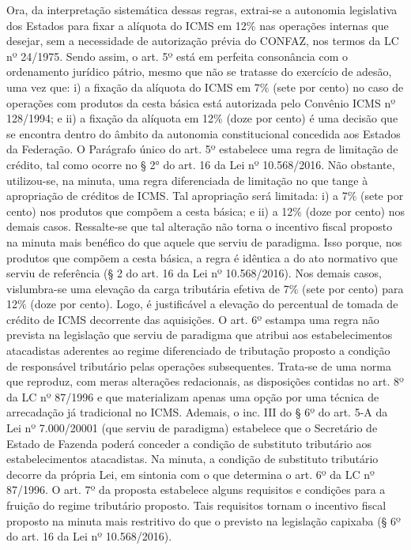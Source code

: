 \documentclass[10pt]{article}
\begin{document}
Ora, da interpretação sistemática dessas regras, extrai-se a autonomia legislativa dos Estados para fixar a alíquota do ICMS em 12\% nas operações internas que desejar, sem a necessidade de autorização prévia do CONFAZ, nos termos da LC nº 24/1975.  
Sendo assim, o art. 5º está em perfeita consonância com o ordenamento jurídico pátrio, mesmo que não se tratasse do exercício de adesão, uma vez que: i) a fixação da alíquota do ICMS em 7\% (sete por cento) no caso de operações com produtos da cesta básica está autorizada pelo Convênio ICMS nº 128/1994; e ii) a fixação da alíquota em 12\% (doze por cento) é uma decisão que se encontra dentro do âmbito da autonomia constitucional concedida aos Estados da Federação. 
O Parágrafo único do art. 5º estabelece uma regra de limitação de crédito, tal como ocorre no § 2° do art. 16 da Lei nº 10.568/2016. Não obstante, utilizou-se, na minuta, uma regra diferenciada de limitação no que tange à apropriação de créditos de ICMS. Tal apropriação será limitada: i) a 7\% (sete por cento) nos produtos que compõem a cesta básica; e ii) a 12\% (doze por cento) nos demais casos. 
Ressalte-se que tal alteração não torna o incentivo fiscal proposto na minuta mais benéfico do que aquele que serviu de paradigma. Isso porque, nos produtos que compõem a cesta básica, a regra é idêntica a do ato normativo que serviu de referência (§ 2 do art. 16 da Lei nº 10.568/2016). Nos demais casos, vislumbra-se uma elevação da carga tributária efetiva de 7\% (sete por cento) para 12\% (doze por cento). Logo, é justificável a elevação do percentual de tomada de crédito de ICMS decorrente das aquisições.
O art. 6º estampa uma regra não prevista na legislação que serviu de paradigma que atribui aos estabelecimentos atacadistas aderentes ao regime diferenciado de tributação proposto a condição de responsável tributário pelas operações subsequentes. 
Trata-se de uma norma que reproduz, com meras alterações redacionais, as disposições contidas no art. 8º da LC nº 87/1996 e que materializam apenas uma opção por uma técnica de arrecadação já tradicional no ICMS. 
Ademais, o inc. III do § 6º do art. 5-A da Lei nº 7.000/20001 (que serviu de paradigma) estabelece que o Secretário de Estado de Fazenda poderá conceder a condição de substituto tributário aos estabelecimentos atacadistas. Na minuta, a condição de substituto tributário decorre da própria Lei, em sintonia com o que determina o art. 6º da LC nº 87/1996. 
O art. 7º da proposta estabelece alguns requisitos e condições para a fruição do regime tributário proposto. Tais requisitos tornam o incentivo fiscal proposto na minuta mais restritivo do que o previsto na legislação capixaba (§ 6º do art. 16 da Lei nº 10.568/2016).
\end{document}
